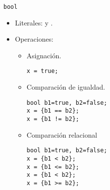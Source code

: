 \begin{frame}[t,fragile]{\texttt{bool}}
\begin{itemize}
  \item Literales:  y .
  \item Operaciones:
    \begin{itemize}
      \item Asignación.
\begin{lstlisting}
x = true;
\end{lstlisting}
      \item Comparación de igualdad.
\begin{lstlisting}
bool b1=true, b2=false;
x = {b1 == b2};
x = {b1 != b2};
\end{lstlisting}
      \item Comparación relacional
\begin{lstlisting}
bool b1=true, b2=false;
x = {b1 < b2};
x = {b1 <= b2};
x = {b1 < b2};
x = {b1 >= b2};
\end{lstlisting}
    \end{itemize}
\end{itemize}
\end{frame}

